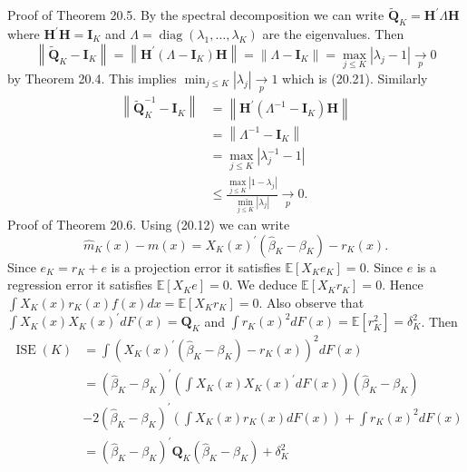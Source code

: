 \documentclass[10pt]{article}
\begin{document}
Proof of Theorem 20.5. By the spectral decomposition we can write $\widetilde{\boldsymbol{Q}}_{K}=\boldsymbol{H}^{\prime} \Lambda \boldsymbol{H}$ where $\boldsymbol{H}^{\prime} \boldsymbol{H}=\boldsymbol{I}_{K}$ and $\Lambda=\operatorname{diag}\left(\lambda_{1}, \ldots, \lambda_{K}\right)$ are the eigenvalues. Then
$$
\left\|\widetilde{\boldsymbol{Q}}_{K}-\boldsymbol{I}_{K}\right\|=\left\|\boldsymbol{H}^{\prime}\left(\Lambda-\boldsymbol{I}_{K}\right) \boldsymbol{H}\right\|=\left\|\Lambda-\boldsymbol{I}_{K}\right\|=\max _{j \leq K}\left|\lambda_{j}-1\right| \underset{p}{\longrightarrow} 0
$$
by Theorem 20.4. This implies $\min _{j \leq K}\left|\lambda_{j}\right| \underset{p}{\longrightarrow} 1$ which is (20.21). Similarly
$$
\begin{aligned}
\left\|\widetilde{\boldsymbol{Q}}_{K}^{-1}-\boldsymbol{I}_{K}\right\| &=\left\|\boldsymbol{H}^{\prime}\left(\Lambda^{-1}-\boldsymbol{I}_{K}\right) \boldsymbol{H}\right\| \\
&=\left\|\Lambda^{-1}-\boldsymbol{I}_{K}\right\| \\
&=\max _{j \leq K}\left|\lambda_{j}^{-1}-1\right| \\
& \leq \frac{\max _{j \leq K}\left|1-\lambda_{j}\right|}{\min _{j \leq K}\left|\lambda_{j}\right|} \underset{p}{\longrightarrow} 0 .
\end{aligned}
$$
Proof of Theorem 20.6. Using (20.12) we can write
$$
\widehat{m}_{K}(x)-m(x)=X_{K}(x)^{\prime}\left(\widehat{\beta}_{K}-\beta_{K}\right)-r_{K}(x) .
$$
Since $e_{K}=r_{K}+e$ is a projection error it satisfies $\mathbb{E}\left[X_{K} e_{K}\right]=0$. Since $e$ is a regression error it satisfies $\mathbb{E}\left[X_{K} e\right]=0$. We deduce $\mathbb{E}\left[X_{K} r_{K}\right]=0$. Hence $\int X_{K}(x) r_{K}(x) f(x) d x=\mathbb{E}\left[X_{K} r_{K}\right]=0$. Also observe that $\int X_{K}(x) X_{K}(x)^{\prime} d F(x)=\boldsymbol{Q}_{K}$ and $\int r_{K}(x)^{2} d F(x)=\mathbb{E}\left[r_{K}^{2}\right]=\delta_{K}^{2}$. Then
$$
\begin{aligned}
\operatorname{ISE}(K) &=\int\left(X_{K}(x)^{\prime}\left(\widehat{\beta}_{K}-\beta_{K}\right)-r_{K}(x)\right)^{2} d F(x) \\
&=\left(\widehat{\beta}_{K}-\beta_{K}\right)^{\prime}\left(\int X_{K}(x) X_{K}(x)^{\prime} d F(x)\right)\left(\widehat{\beta}_{K}-\beta_{K}\right) \\
&-2\left(\widehat{\beta}_{K}-\beta_{K}\right)^{\prime}\left(\int X_{K}(x) r_{K}(x) d F(x)\right)+\int r_{K}(x)^{2} d F(x) \\
&=\left(\widehat{\beta}_{K}-\beta_{K}\right)^{\prime} \boldsymbol{Q}_{K}\left(\widehat{\beta}_{K}-\beta_{K}\right)+\delta_{K}^{2}
\end{aligned}
$$
\end{document}

